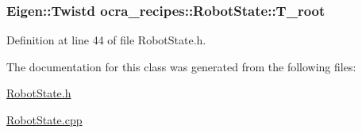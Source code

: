 \subsubsection[{\texorpdfstring{T\+\_\+root}{T_root}}]{\setlength{\rightskip}{0pt plus 5cm}Eigen\+::\+Twistd ocra\+\_\+recipes\+::\+Robot\+State\+::\+T\+\_\+root}\hypertarget{classocra__recipes_1_1RobotState_ae71e2d5ff8976c859921e06a4f35bf25}{}\label{classocra__recipes_1_1RobotState_ae71e2d5ff8976c859921e06a4f35bf25}


Definition at line 44 of file Robot\+State.\+h.



The documentation for this class was generated from the following files\+:\begin{DoxyCompactItemize}
\item 
\hyperlink{RobotState_8h}{Robot\+State.\+h}\item 
\hyperlink{RobotState_8cpp}{Robot\+State.\+cpp}\end{DoxyCompactItemize}
